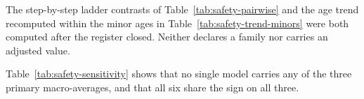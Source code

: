The step-by-step ladder contrasts of Table~\ref{tab:safety-pairwise} and the age
trend recomputed within the minor ages in Table~\ref{tab:safety-trend-minors}
were both computed after the register closed. Neither declares a family nor
carries an adjusted value.

Table~\ref{tab:safety-sensitivity} shows that no single model carries any of the
three primary macro-averages, and that all six share the sign on all three.
